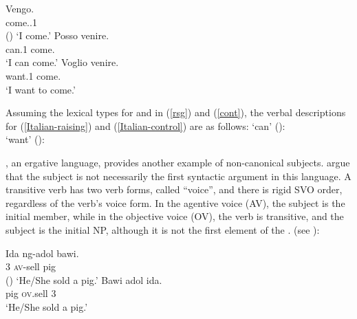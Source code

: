 \eal
\ex 
\label{Italian}
\gll Vengo.\\
     come.\PRS.1\SG\\\hfill()
\glt `I come.'
\ex 
\label{Italian-raising}
\gll Posso venire.\\
     can.1\SG{} come.\INF\\
\glt `I can come.'
\ex 
\label{Italian-control}
\gll Voglio venire.\\ 
     want.1\SG{} come.\INF\\
\glt `I want to come.'
\zl

Assuming the lexical types for  and  in (\ref{rsg}) and
(\ref{cont}), the verbal descriptions for (\ref{Italian-raising}) and (\ref{Italian-control}) are as
follows:
\eal
\ex	
{} `can' ():\\
\label{rais1}
\ex 
{} `want' ():\\
\zl


, an ergative language, provides another example of non-canonical subjects.  \citet{WechslerandArka1998} argue that the subject is not necessarily the first syntactic argument in this language. A transitive verb has two verb forms, called ``voice'', and there is  rigid SVO order,
regardless of the verb's voice form. In the agentive voice (AV), the
subject is the \argst initial member, while in the objective voice (OV), the verb is transitive, and
the subject is the initial NP, although it is not the first element of the \argstl.
   (see
):

\eal
\ex  
\gll Ida ng-adol bawi.\\
     3\SG{} \textsc{av}-sell pig\\ \hfill()
\glt `He/She sold a pig.'
\ex 
\gll Bawi adol ida.\\
     pig \textsc{ov}.sell 3\SG \\
\glt `He/She sold a pig.' 
\zl

